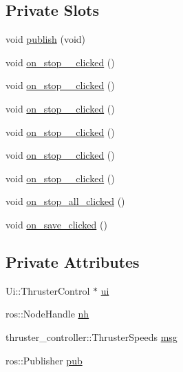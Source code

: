 \subsection*{Private Slots}
\begin{DoxyCompactItemize}
\item 
void \hyperlink{classThrusterControl_a95d45f2dfc985905c38609e62e34e034}{publish} (void)
\item 
void \hyperlink{classThrusterControl_a06b4ddc8d7c6fb6fc5da3c7ef6848a46}{on\+\_\+stop\+\_\+\_\+clicked} ()
\item 
void \hyperlink{classThrusterControl_a47ca8a5e39e171387c4880c31e473c52}{on\+\_\+stop\+\_\+\_\+clicked} ()
\item 
void \hyperlink{classThrusterControl_a6ffa3ce9251dde64ef58ede91df92bc0}{on\+\_\+stop\+\_\+\_\+clicked} ()
\item 
void \hyperlink{classThrusterControl_a4b4559c4aedefa2ab596493ee03c9b8b}{on\+\_\+stop\+\_\+\_\+clicked} ()
\item 
void \hyperlink{classThrusterControl_a4d416bfd4a08647d29416c87fe7772f9}{on\+\_\+stop\+\_\+\_\+clicked} ()
\item 
void \hyperlink{classThrusterControl_abe2f01acb93eb04de3ba4d3c43d34eb6}{on\+\_\+stop\+\_\+\_\+clicked} ()
\item 
void \hyperlink{classThrusterControl_a999cc3efe1d7cd3b5e23e4f5155abd89}{on\+\_\+stop\+\_\+all\+\_\+clicked} ()
\item 
void \hyperlink{classThrusterControl_a303efc124d6a47e0f8bc436bd024d159}{on\+\_\+save\+\_\+clicked} ()
\end{DoxyCompactItemize}
\subsection*{Private Attributes}
\begin{DoxyCompactItemize}
\item 
Ui\+::\+Thruster\+Control $\ast$ \hyperlink{classThrusterControl_aacfb61a878a7d29e3ccf61c63a463d3f}{ui}
\item 
ros\+::\+Node\+Handle \hyperlink{classThrusterControl_addb2fe623a853b5a338a6cd5554261ca}{nh}
\item 
thruster\+\_\+controller\+::\+Thruster\+Speeds \hyperlink{classThrusterControl_a70599279984964220a5612e4962814b2}{msg}
\item 
ros\+::\+Publisher \hyperlink{classThrusterControl_a930801a24cc1373018245239f2eba529}{pub}
\end{DoxyCompactItemize}


